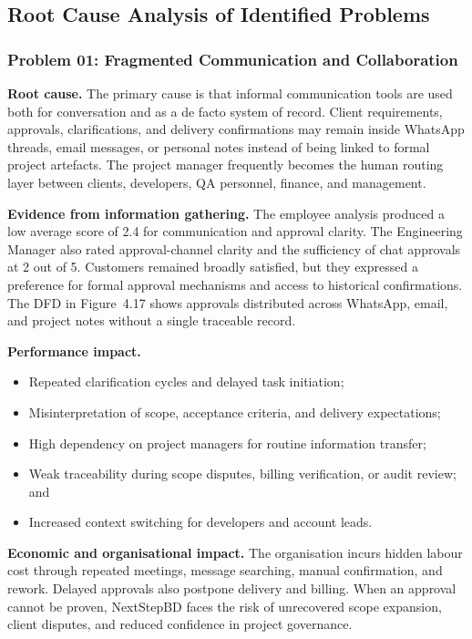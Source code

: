 \documentclass[12pt,a4paper]{report}
\begin{document}
\subsection{Root Cause Analysis of Identified Problems}
\label{subsec:root-cause-analysis}

\subsubsection{Problem 01: Fragmented Communication and Collaboration}\label{sec:rc-communication}

\textbf{Root cause.}
The primary cause is that informal communication tools are used both for conversation and as
a de facto system of record. Client requirements, approvals, clarifications, and delivery
confirmations may remain inside WhatsApp threads, email messages, or personal notes instead
of being linked to formal project artefacts. The project manager frequently becomes the human
routing layer between clients, developers, QA personnel, finance, and management.

\textbf{Evidence from information gathering.}
The employee analysis produced a low average score of 2.4 for communication and approval
clarity. The Engineering Manager also rated approval-channel clarity and the sufficiency of chat
approvals at 2 out of 5. Customers remained broadly satisfied, but they expressed a preference
for formal approval mechanisms and access to historical confirmations. The DFD in
Figure~4.17 shows approvals distributed across WhatsApp, email, and project notes without a
single traceable record.

\textbf{Performance impact.}
\begin{itemize}[leftmargin=1.6em]
    \item Repeated clarification cycles and delayed task initiation;
    \item Misinterpretation of scope, acceptance criteria, and delivery expectations;
    \item High dependency on project managers for routine information transfer;
    \item Weak traceability during scope disputes, billing verification, or audit review; and
    \item Increased context switching for developers and account leads.
\end{itemize}

\textbf{Economic and organisational impact.}
The organisation incurs hidden labour cost through repeated meetings, message searching,
manual confirmation, and rework. Delayed approvals also postpone delivery and billing. When
an approval cannot be proven, NextStepBD faces the risk of unrecovered scope expansion,
client disputes, and reduced confidence in project governance.
\end{document}
